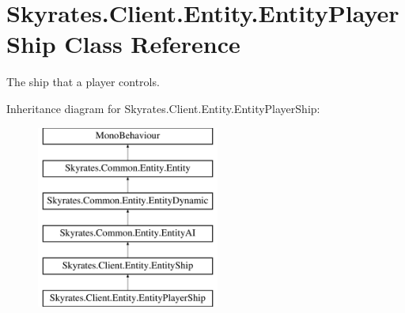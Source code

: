 \hypertarget{class_skyrates_1_1_client_1_1_entity_1_1_entity_player_ship}{\section{Skyrates.\-Client.\-Entity.\-Entity\-Player\-Ship Class Reference}
\label{class_skyrates_1_1_client_1_1_entity_1_1_entity_player_ship}
}


The ship that a player controls.  


Inheritance diagram for Skyrates.\-Client.\-Entity.\-Entity\-Player\-Ship\-:\begin{figure}[H]
\begin{center}
\leavevmode
\includegraphics[height=6.000000cm]{class_skyrates_1_1_client_1_1_entity_1_1_entity_player_ship}
\end{center}
\end{figure}
